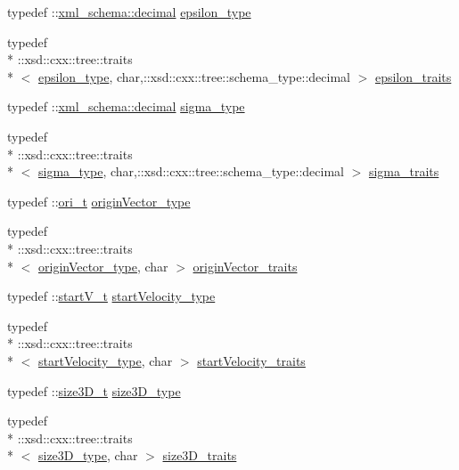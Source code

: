 \begin{DoxyCompactItemize}
\item 
typedef \-::\hyperlink{namespacexml__schema_a69bfaf24f63a8c18ebd8e21db6b343df}{xml\-\_\-schema\-::decimal} \hyperlink{classcuboid__t_ac4a981a7963b1b2105d448cf42ab1230}{epsilon\-\_\-type}
\item 
typedef \\*
\-::xsd\-::cxx\-::tree\-::traits\\*
$<$ \hyperlink{classcuboid__t_ac4a981a7963b1b2105d448cf42ab1230}{epsilon\-\_\-type}, char,\-::xsd\-::cxx\-::tree\-::schema\-\_\-type\-::decimal $>$ \hyperlink{classcuboid__t_a909ff9ef57adeb2edaa27cda6e531c44}{epsilon\-\_\-traits}
\item 
typedef \-::\hyperlink{namespacexml__schema_a69bfaf24f63a8c18ebd8e21db6b343df}{xml\-\_\-schema\-::decimal} \hyperlink{classcuboid__t_ae1de9c7b1d2b2a9098de31c546c0ff83}{sigma\-\_\-type}
\item 
typedef \\*
\-::xsd\-::cxx\-::tree\-::traits\\*
$<$ \hyperlink{classcuboid__t_ae1de9c7b1d2b2a9098de31c546c0ff83}{sigma\-\_\-type}, char,\-::xsd\-::cxx\-::tree\-::schema\-\_\-type\-::decimal $>$ \hyperlink{classcuboid__t_a40e03084467dcf27dc74ece86086b047}{sigma\-\_\-traits}
\item 
typedef \-::\hyperlink{classori__t}{ori\-\_\-t} \hyperlink{classcuboid__t_a20d67505efc00dc82947ce881aec1e76}{origin\-Vector\-\_\-type}
\item 
typedef \\*
\-::xsd\-::cxx\-::tree\-::traits\\*
$<$ \hyperlink{classcuboid__t_a20d67505efc00dc82947ce881aec1e76}{origin\-Vector\-\_\-type}, char $>$ \hyperlink{classcuboid__t_a88fa351b02759f012d3dc7cabd2097b8}{origin\-Vector\-\_\-traits}
\item 
typedef \-::\hyperlink{classstartV__t}{start\-V\-\_\-t} \hyperlink{classcuboid__t_a7b9bd2a7888abc4b08f6f4e91ac9a81f}{start\-Velocity\-\_\-type}
\item 
typedef \\*
\-::xsd\-::cxx\-::tree\-::traits\\*
$<$ \hyperlink{classcuboid__t_a7b9bd2a7888abc4b08f6f4e91ac9a81f}{start\-Velocity\-\_\-type}, char $>$ \hyperlink{classcuboid__t_a0d43837eb6423a21e59b6f36012b244a}{start\-Velocity\-\_\-traits}
\item 
typedef \-::\hyperlink{classsize3D__t}{size3\-D\-\_\-t} \hyperlink{classcuboid__t_abf130ab4ed6d70047bb193a41283ec28}{size3\-D\-\_\-type}
\item 
typedef \\*
\-::xsd\-::cxx\-::tree\-::traits\\*
$<$ \hyperlink{classcuboid__t_abf130ab4ed6d70047bb193a41283ec28}{size3\-D\-\_\-type}, char $>$ \hyperlink{classcuboid__t_a8f449274f0802c092d0abd4f45ea1cdc}{size3\-D\-\_\-traits}
\end{DoxyCompactItemize}
